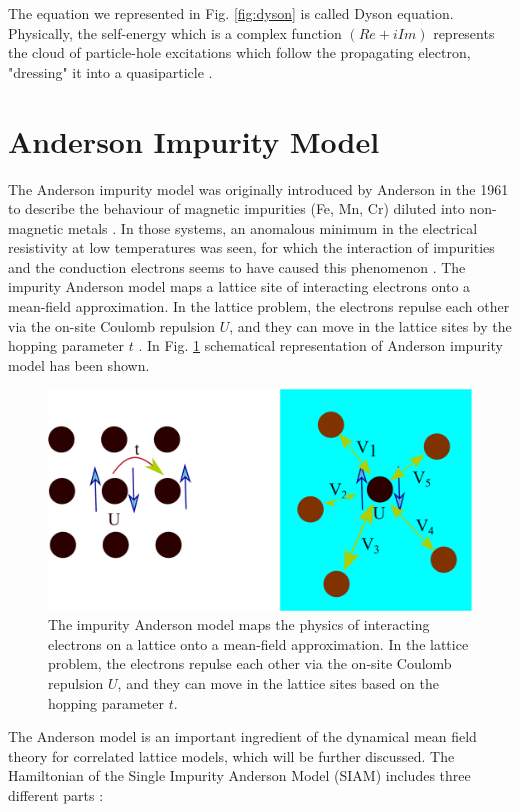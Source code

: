 The equation we represented in Fig. \ref{fig:dyson} is called Dyson equation. Physically, the self-energy which is a complex function $(Re+iIm)$ represents the cloud of particle-hole excitations which follow the propagating electron, "dressing" it into a quasiparticle \cite{Ivanov, Andre, Piers}. 






\section{Anderson Impurity Model}

The Anderson impurity model was originally introduced by Anderson in the 1961 to describe the behaviour of magnetic impurities (Fe, Mn, Cr) diluted into non-magnetic metals \cite{Anderson}.  In those systems, an anomalous minimum in the electrical resistivity at low temperatures was seen, for which the interaction of impurities and the conduction electrons seems to have caused this phenomenon \cite{Haas}. The impurity Anderson model maps a lattice site of interacting electrons onto a mean-field approximation. In the lattice problem, the electrons repulse each other via the on-site Coulomb repulsion $U$, and they can move in the lattice sites by the hopping parameter $t$  \cite{Anderson}. In Fig. \ref{fig:bath} schematical representation of Anderson impurity model has been shown.


\begin{figure}[ht]
\centering
    \includegraphics[width=0.6\linewidth]{fig2/bath1.pdf}
   
\caption{The impurity Anderson model maps the physics of interacting electrons on a lattice onto a mean-field approximation. In the lattice problem, the electrons repulse each other via the on-site Coulomb repulsion $U$, and they can move in the lattice sites based on the hopping parameter $t$.}
\label{fig:bath}
\end{figure}

The Anderson model is an important ingredient of the dynamical mean field theory for correlated lattice models, which will be further discussed. The Hamiltonian of the Single Impurity Anderson Model (SIAM) includes three different parts \cite{Carlos}:   

